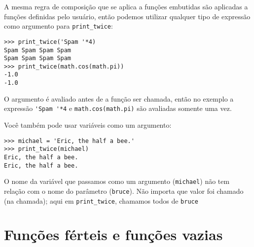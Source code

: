 A mesma regra de composição que se aplica a funções embutidas são
aplicadas a funções definidas pelo usuário, então podemos utilizar
qualquer tipo de expressão como argumento para \verb"print_twice":


\beforeverb
\begin{verbatim}
>>> print_twice('Spam '*4)
Spam Spam Spam Spam
Spam Spam Spam Spam
>>> print_twice(math.cos(math.pi))
-1.0
-1.0
\end{verbatim}
\afterverb
%

%
O argumento é avaliado antes de a função ser chamada, então no exemplo
a expressão \verb"'Spam '*4" e {\tt math.cos(math.pi)} são avaliadas
somente uma vez.



Você também pode usar variáveis como um argumento:

\beforeverb
\begin{verbatim}
>>> michael = 'Eric, the half a bee.'
>>> print_twice(michael)
Eric, the half a bee.
Eric, the half a bee.
\end{verbatim}
\afterverb
%

O nome da variável que passamos como um argumento ({\tt michael}) não tem
relação com o nome do parâmetro ({\tt bruce}). Não importa que valor foi
chamado (na chamada); aqui em \verb"print_twice", chamamos todos de {\tt bruce}

\section{Funções férteis e funções vazias}


